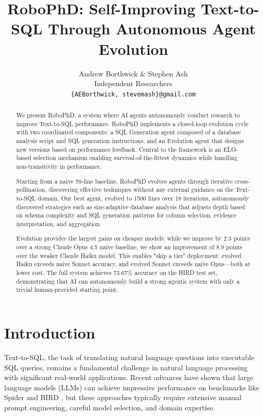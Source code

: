 \documentclass{article}
\title{RoboPhD: Self-Improving Text-to-SQL Through Autonomous Agent Evolution}
\author{Andrew Borthwick \& Stephen Ash \\

Independent Researchers\\
\texttt{\{AEBorthwick, stevemash\}@gmail.com}
}
\begin{document}
\maketitle

\begin{abstract}
We present RoboPhD, a system where AI agents autonomously conduct research to improve Text-to-SQL performance. RoboPhD implements a closed-loop evolution cycle with two coordinated components: a SQL Generation agent composed of a database analysis script and SQL generation instructions, and an Evolution agent that designs new versions based on performance feedback. Central to the framework is an ELO-based selection mechanism enabling survival-of-the-fittest dynamics while handling non-transitivity in performance.

Starting from a naive 70-line baseline, RoboPhD evolves agents through iterative cross-pollination, discovering effective techniques without any external guidance on the Text-to-SQL domain. Our best agent, evolved to 1500 lines over 18 iterations, autonomously discovered strategies such as size-adaptive database analysis that adjusts depth based on schema complexity and SQL generation patterns for column selection, evidence interpretation, and aggregation.

Evolution provides the largest gains on cheaper models: while we improve by 2.3 points over a strong Claude Opus 4.5 naive baseline, we show an improvement of 8.9 points over the weaker Claude Haiku model. This enables "skip a tier" deployment: evolved Haiku exceeds naive Sonnet accuracy, and evolved Sonnet exceeds naive Opus—both at lower cost.
The full system achieves 73.67\% accuracy on the BIRD test set, demonstrating that AI can autonomously build a strong agentic system with only a trivial human-provided starting point.
\end{abstract}

\section{Introduction}
\label{sec:intro}

Text-to-SQL, the task of translating natural language questions into executable SQL queries, remains a fundamental challenge in natural language processing with significant real-world applications. 
Recent advances have shown that large language models (LLMs) can achieve impressive performance on benchmarks like Spider \citep{spider2018} and BIRD \citep{bird2023}, but these approaches typically require extensive manual prompt engineering, careful model selection, and domain expertise.
\end{document}
